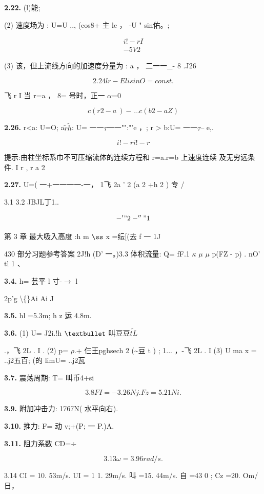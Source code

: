 \noindent\textbf{2.22.} (l)能;

(2) 速度场为 : U=U ,., (cos8+ 主 le ， -U " sin佑。;

\begin{gather*}
  i!- r I\\
-5V2
\end{gather*}

(3) 该，但上流线方向的加速度分量为 : a ， 二一一\_- 8 .J26

\[2.24lr - ElisinO=const.\]

飞 r I 当 r=a ， 8= 号时，正一 $\alpha$=0

\[c( r2 -a ~ ) -.. . c(b 2-aZ )\]

\noindent\textbf{2.26.} r<a: U=O; a$\tilde{r}$$\tilde{h}$: U= 一一$\tau$一一"":"'e ，; r > b:U= 一一$\tau$-- e,.

\[i!- r i!- r\]

提示:由柱坐标系巾不可压缩流体的连续方程和 r=a.r=b 上速度连续 及无穷远条件. I r , r a 2

\noindent\textbf{2.27.} U=( 一+一一一一-一， 1飞 2a ' 2 (a 2 +h 2 ) 专 /

3.1 3.2 JBJL丁1..

\[-'"2 - ''"1\]

第 3 章 最大吸入高度 :h m ${\rm ß}$ x =纭[(去 f 一 1J

430 部分习题参考答案 2J!h (D' 一。)3.3 体积流量: Q= fF.1 $\kappa$ $\mu$ $\mu$ p(FZ - p) . nO' tl 1 、

\noindent\textbf{3.4.} h= 芸平 l 寸-$\rightarrow$ l

2p'g \textbackslash\{\}Ai Ai J

\noindent\textbf{3.5.} hl =5.3m; h z 运 4.8m.

\noindent\textbf{3.6.} (1) U= J2i.!h ${\rm •}$ 叫豆豆$\tilde{tL}$

.，飞 2L . I . (2) p= $\rho$.+ 仨王pghsech 2 (\textasciitilde{}豆 t ) ; 1... ，-飞 2L . I (3) U ma x = ..j2五百; (的 limU= ..j2瓦

\noindent\textbf{3.7.} 震荡周期: T= 叫币4+si

\[3.8 FI = -3. 26Nj .Fz =5. 21Ni.\]

\noindent\textbf{3.9.} 附加冲击力: 1767N( 水平向右).

\noindent\textbf{3.10.} 推力: F= 动 v;+(P; 一 P.)A.

\noindent\textbf{3.11.} 阻力系数 CD=$\div$

\[3. 13\omega =3. 96rad/s.\]

3.14 CI = 10. 53m/s. UI = 1 1. 29m/s. 叫 =15. 44m/s. 自 =43 0 ; Cz =20. Om/ 日，

